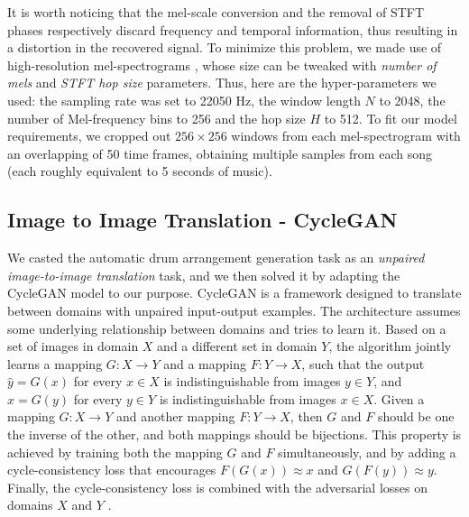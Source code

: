 \documentclass[journal]{IEEEtran}
\begin{document}
It is worth noticing that the mel-scale conversion and the removal of STFT phases respectively discard frequency and temporal information, thus resulting in a distortion in the recovered signal. To minimize this problem, we made use of high-resolution mel-spectrograms \cite{vasquez2019melnet}, whose size can be tweaked with \textit{number of mels} and \textit{STFT hop size} parameters. Thus, here are the hyper-parameters we used: the sampling rate was set to 22050 Hz, the window length $N$ to 2048, the number of Mel-frequency bins to 256 and the hop size $H$ to 512. To fit our model requirements, we cropped out $256\times256$ windows from each mel-spectrogram with an overlapping of 50 time frames, obtaining multiple samples from each song (each roughly equivalent to 5 seconds of music). 

\subsection{Image to Image Translation - CycleGAN}
We casted the automatic drum arrangement generation task as an \textit{unpaired image-to-image translation} task, and we then solved it by adapting the CycleGAN model to our purpose. CycleGAN is a framework designed to translate between domains with unpaired input-output examples. The architecture assumes some underlying relationship between domains and tries to learn it. Based on a set of images in domain $X$ and a different set in domain $Y$, the algorithm jointly learns a mapping $G: X \rightarrow Y$ and a mapping  $F: Y \rightarrow X$, such that the output $\hat{y} = G(x)$ for every $x \in X$ is indistinguishable from images $y \in Y$, and $\hat{x} = G(y)$ for every $y \in Y$ is indistinguishable from images $x \in X$. Given a mapping $G : X \rightarrow Y$ and another mapping $F : Y \rightarrow X$, then $G$ and $F$ should be one the inverse of the other, and both mappings should be bijections. This property is achieved by training both the mapping $G$ and $F$ simultaneously, and by adding a cycle-consistency loss that encourages $F(G(x))\approx x$ and $G(F(y))\approx y$. Finally, the cycle-consistency loss is combined with the adversarial losses on domains $X$ and $Y$ \cite{zhu2017unpaired}.
\end{document}
